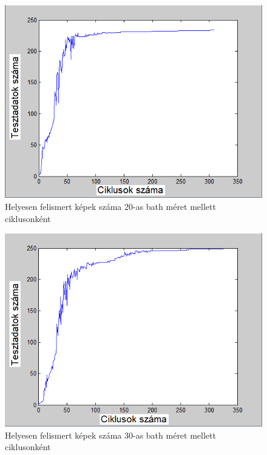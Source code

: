 \begin{figure}[h]
\centering

\includegraphics[scale=0.4]{images/Teszt8}
\caption{Helyesen felismert képek száma  20-as bath méret mellett ciklusonként}

\label{fig:batchsize2}
\end{figure}

\begin{figure}[h]
\centering

\includegraphics[scale=0.4]{images/Teszt9}
\caption{Helyesen felismert képek száma  30-as bath méret mellett ciklusonként}

\label{fig:batchsize3}
\end{figure}

